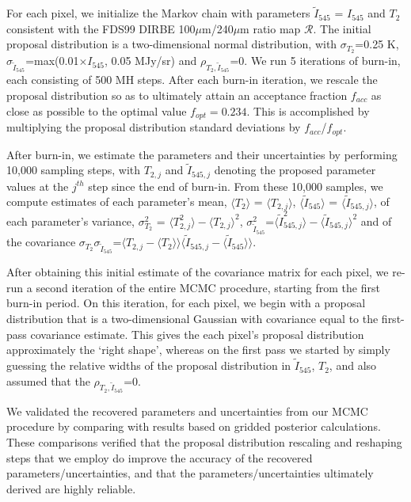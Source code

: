 \documentclass{emulateapj}
\begin{document}
For each pixel, we initialize the Markov chain with parameters 
$\tilde{I}_{545}$ = $I_{545}$ and $T_2$ consistent with the FDS99 
DIRBE 100$\mu$m/240$\mu$m ratio map $\mathscr{R}$. The initial proposal 
distribution is a two-dimensional normal distribution, with 
$\sigma_{T_2}$=0.25 K, 
$\sigma_{\tilde{I}_{545}}$=max(0.01$\times$$I_{545}$, 0.05 MJy/sr) and
$\rho_{T_2, \tilde{I}_{545}}$=0. We run 5 iterations of burn-in, each 
consisting of 500 MH steps. After each burn-in iteration, we rescale the 
proposal distribution so as to ultimately attain an acceptance fraction 
$f_{acc}$ as close as possible to the optimal value $f_{opt}=0.234$. This is 
accomplished by multiplying the proposal distribution standard deviations by 
$f_{acc}$/$f_{opt}$.

After burn-in, we estimate the parameters and their uncertainties by performing
10,000 sampling steps, with $T_{2, j}$ and $\tilde{I}_{545, j}$ denoting the 
proposed parameter values at the $j^{th}$ step since the end of burn-in. From 
these 10,000 samples, we compute estimates of each parameter's mean, 
$\langle T_2 \rangle$ = $\langle T_{2, j} \rangle$, 
$\langle \tilde{I}_{545} \rangle$ = $\langle \tilde{I}_{545, j} \rangle$, of 
each parameter's variance, 
$\sigma^2_{T_2}$ = $\langle T^2_{2, j} \rangle-\langle T_{2, j} \rangle ^2$, 
$\sigma^2_{\tilde{I}_{545}}$=$\langle \tilde{I}^2_{545, j} 
\rangle-\langle \tilde{I}_{545, j} \rangle ^2$ and of the covariance 
$\sigma_{T_2}\sigma_{\tilde{I}_{545}}$=$\langle T_{2,j}-\langle T_2 \rangle 
\rangle \langle \tilde{I}_{545, j} - \langle \tilde{I}_{545} \rangle \rangle$. 

After obtaining this initial estimate of the covariance matrix for each pixel, 
we re-run a second iteration of the entire MCMC procedure, starting from the 
first burn-in period. On this iteration, for each pixel, we begin with a 
proposal distribution that is a two-dimensional Gaussian with covariance equal 
to the first-pass covariance estimate. This gives the each pixel's proposal 
distribution approximately the `right shape', whereas on the first pass we 
started by simply guessing the relative widths of the proposal distribution in 
$\tilde{I}_{545}$, $T_2$, and also assumed that the 
$\rho_{T_2, \tilde{I}_{545}}$=0. 

We validated the recovered parameters and uncertainties from our MCMC procedure
by comparing with results based on gridded posterior calculations. These 
comparisons verified that the proposal distribution rescaling and reshaping 
steps that we employ do improve the accuracy of the recovered 
parameters/uncertainties, and that the parameters/uncertainties ultimately 
derived are highly reliable.
\end{document}
